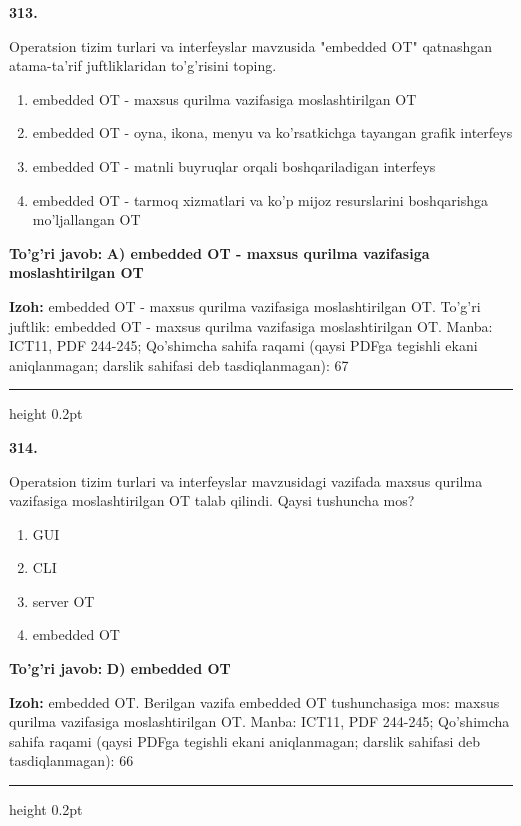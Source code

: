 \documentclass[10pt,a4paper]{article}
\begin{document}
{\bfseries\sffamily\color{ink} 313.}
\par
Operatsion tizim turlari va interfeyslar mavzusida "embedded OT" qatnashgan atama-ta'rif juftliklaridan to'g'risini toping.
\begin{enumerate}[label=\Alph*),leftmargin=9mm]
\item embedded OT - maxsus qurilma vazifasiga moslashtirilgan OT
\item embedded OT - oyna, ikona, menyu va ko'rsatkichga tayangan grafik interfeys
\item embedded OT - matnli buyruqlar orqali boshqariladigan interfeys
\item embedded OT - tarmoq xizmatlari va ko'p mijoz resurslarini boshqarishga mo'ljallangan OT
\end{enumerate}
\begin{tcolorbox}[enhanced,breakable,colback=teal!4,colframe=teal!60!black,boxrule=0.45pt,arc=1.2mm,left=2.7mm,right=2.7mm,top=1.8mm,bottom=1.8mm,before skip=2mm,after skip=2mm]
{\bfseries\sffamily\color{teal}To'g'ri javob:} \textbf{A) embedded OT - maxsus qurilma vazifasiga moslashtirilgan OT}
\par\smallskip
{\bfseries Izoh:} embedded OT - maxsus qurilma vazifasiga moslashtirilgan OT. To'g'ri juftlik: embedded OT - maxsus qurilma vazifasiga moslashtirilgan OT. Manba: ICT11, PDF 244-245; Qo'shimcha sahifa raqami (qaysi PDFga tegishli ekani aniqlanmagan; darslik sahifasi deb tasdiqlanmagan): 67
\end{tcolorbox}
\vspace{2mm}\hrule height 0.2pt\vspace{3mm}

{\bfseries\sffamily\color{ink} 314.}
\par
Operatsion tizim turlari va interfeyslar mavzusidagi vazifada maxsus qurilma vazifasiga moslashtirilgan OT talab qilindi. Qaysi tushuncha mos?
\begin{enumerate}[label=\Alph*),leftmargin=9mm]
\item GUI
\item CLI
\item server OT
\item embedded OT
\end{enumerate}
\begin{tcolorbox}[enhanced,breakable,colback=teal!4,colframe=teal!60!black,boxrule=0.45pt,arc=1.2mm,left=2.7mm,right=2.7mm,top=1.8mm,bottom=1.8mm,before skip=2mm,after skip=2mm]
{\bfseries\sffamily\color{teal}To'g'ri javob:} \textbf{D) embedded OT}
\par\smallskip
{\bfseries Izoh:} embedded OT. Berilgan vazifa embedded OT tushunchasiga mos: maxsus qurilma vazifasiga moslashtirilgan OT. Manba: ICT11, PDF 244-245; Qo'shimcha sahifa raqami (qaysi PDFga tegishli ekani aniqlanmagan; darslik sahifasi deb tasdiqlanmagan): 66
\end{tcolorbox}
\vspace{2mm}\hrule height 0.2pt\vspace{3mm}
\end{document}
